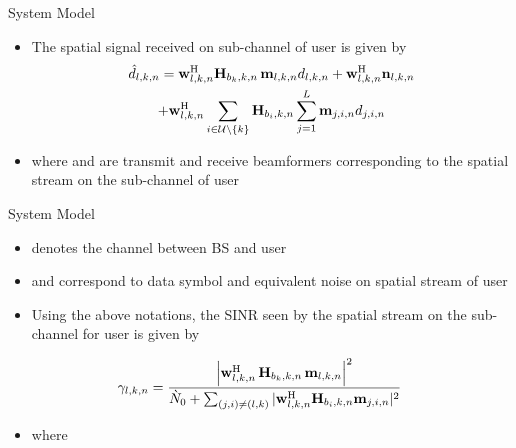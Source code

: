 \documentclass[10pt]{beamer}
\begin{document}
\begin{frame}{System Model}
\begin{itemize}
\item The  spatial signal received on sub-channel  of user  is given by
\begin{multline}\label{eqn-1}
\hat{d}_{l,k,n} = \mathbf{w}_{l,k,n}^{\mathrm{H}} \mathbf{H}_{b_k,k,n} \,\mathbf{m}_{l,k,n} d_{l,k,n} + \mathbf{w}_{l,k,n}^{\mathrm{H}} \mathbf{n}_{l,k,n} \\ 
+ \mathbf{w}_{l,k,n}^{\mathrm{H}} \sum_{i \in \mathcal{U} \backslash \left \lbrace k \right \rbrace} \mathbf{H}_{b_i,k,n} \sum_{j = 1}^L \mathbf{m}_{j,i,n}d_{j,i,n}
\end{multline}
\item where  and  are transmit and receive beamformers corresponding to the  spatial stream on the  sub-channel of user 
\end{itemize}
\end{frame}

\begin{frame}{System Model}
\begin{itemize}
\item {} denotes the channel between \ac{BS}  and user 
\item {} and  correspond to data symbol and equivalent noise on  spatial stream of user 
\item Using the above notations, the \acs{SINR} seen by the  spatial stream on the  sub-channel for user  is given by
\end{itemize}
\begin{equation}\label{eq:SINR}
\gamma_{l,k,n} = \dfrac{\left |\mathbf{w}_{l,k,n}^{\mathrm{H}} \, \mathbf{H}_{b_k,k,n} \, \mathbf{m}_{l,k,n} \right |^2}{\grave{N}_0 + \sum_{(j,i) \neq (l,k)} |\mathbf{w}_{l,k,n}^{\mathrm{H}} \mathbf{H}_{b_i,k,n} \mathbf{m}_{j,i,n} |^2}
\end{equation}
\begin{itemize}
\item where 
\end{itemize}
\end{frame}
\end{document}
